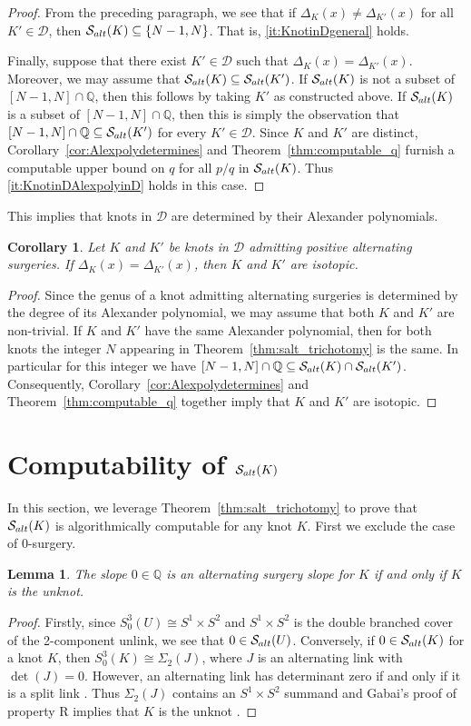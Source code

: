 \documentclass{amsart} %
\newcommand{\D}{\mathcal{D}}
\newcommand{\Q}{\mathbb{Q}}
\newcommand{\Salt}{\mathcal{S}_{\rm alt}}
\theoremstyle{thm}
\newtheorem{lem}[Theorem]{Lemma}
\newtheorem{cor}[Theorem]{Corollary}
\theoremstyle{definition}
\numberwithin{equation}{section}
\begin{document}
\begin{proof}
    From the preceding paragraph, we see that if $\Delta_K(x)\neq \Delta_{K'}(x)$ for all $K'\in \D$, then $\Salt(K)\subseteq\{N-1,N\}$. That is, \eqref{it:KnotinDgeneral} holds.

    Finally, suppose that there exist $K'\in \D$ such that $\Delta_K(x)=\Delta_{K'}(x)$. Moreover, we may assume that $\Salt(K)\subseteq \Salt(K')$. If $\Salt(K)$ is not a subset of $[N-1,N]\cap \Q$, then this follows by taking $K'$ as constructed above. If $\Salt(K)$ is a subset of $[N-1,N]\cap \Q$, then this is simply the observation that $[N-1,N]\cap \Q\subseteq \Salt(K')$ for every $K'\in \D$.
    Since $K$ and $K'$ are distinct, Corollary~\ref{cor:Alexpolydetermines} and Theorem~\ref{thm:computable_q} furnish a computable upper bound on $q$ for all $p/q$ in $\Salt(K)$. Thus \eqref{it:KnotinDAlexpolyinD} holds in this case.
\end{proof}


This implies that knots in $\D$ are determined by their Alexander polynomials.
\begin{cor}\label{cor:D_determined_by_Alex_poly}
Let $K$ and $K'$ be knots in $\D$ admitting positive alternating surgeries. If $\Delta_K(x)=\Delta_{K'}(x)$, then $K$ and $K'$ are isotopic.
\end{cor}
\begin{proof}
Since the genus of a knot admitting alternating surgeries is determined by the degree of its Alexander polynomial, we may assume that both $K$ and $K'$ are non-trivial. If $K$ and $K'$ have the same Alexander polynomial, then for both knots the integer $N$ appearing in Theorem~\ref{thm:salt_trichotomy} is the same. In particular for this integer we have $[N-1,N]\cap \Q \subseteq\Salt(K)\cap \Salt(K')$. Consequently, Corollary~\ref{cor:Alexpolydetermines} and Theorem~\ref{thm:computable_q} together imply that $K$ and $K'$ are isotopic.
\end{proof}


\section{Computability of \texorpdfstring{$\Salt(K)$}{Salt(K)}}


In this section, we leverage Theorem~\ref{thm:salt_trichotomy} to prove that $\Salt(K)$ is algorithmically computable for any knot $K$. First we exclude the case of $0$-surgery.

\begin{lem}\label{lem:0_slope}
    The slope $0\in \Q$ is an alternating surgery slope for $K$ if and only if $K$ is the unknot.
\end{lem}
\begin{proof}
    Firstly, since $S_0^3(U)\cong S^1 \times S^2$ and $S^1\times S^2$ is the double branched cover of the 2-component unlink, we see that $0\in \Salt(U)$. Conversely, if $0\in \Salt(K)$ for a knot $K$, then $S_0^3(K)\cong \Sigma_2(J)$, where $J$ is an alternating link with $\det(J)=0$. However, an alternating link has determinant zero if and only if it is a split link \cite{lickorish}. Thus $\Sigma_2(J)$ contains an $S^1\times S^2$ summand and Gabai's proof of property R implies that $K$ is the unknot \cite{Ga87}.
\end{proof}
\end{document}
